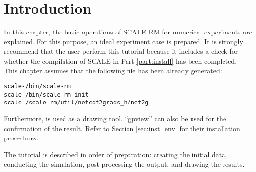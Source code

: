 \section{Introduction} \label{sec:ideal_exp_intro}

In this chapter, the basic operations of SCALE-RM for numerical experiments are explained. For this purpose, an ideal experiment case is prepared. It is strongly recommend that the user perform this tutorial because it includes a check for whether the compilation of SCALE  in Part \ref{part:install} has been completed. This chapter assumes that the following file has been already generated:
\begin{alltt}
  scale-{\version}/bin/scale-rm
  scale-{\version}/bin/scale-rm_init
  scale-{\version}/scale-rm/util/netcdf2grads_h/net2g
\end{alltt}
Furthermore, \grads is used as a drawing tool. ``gpview'' can also be used for the confirmation of the result. Refer to Section \ref{sec:inst_env} for their installation procedures.

The tutorial is described in order of preparation: creating the initial data, conducting the simulation, post-processing the output, and drawing the results.


